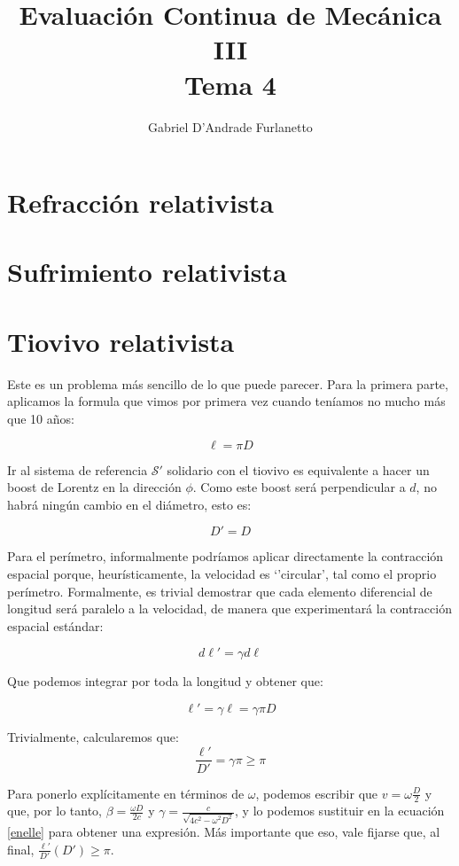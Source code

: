 \documentclass[a4paper,12pt]{article}
\begin{document}
\title{Evaluación Continua de Mecánica III\\ Tema 4}
\author{Gabriel D'Andrade Furlanetto}
\maketitle 

\section{Refracción relativista}

\section{Sufrimiento relativista}

\section{Tiovivo relativista}

Este es un problema más sencillo de lo que puede parecer. Para la primera parte, aplicamos la formula que vimos por primera vez cuando teníamos no mucho más que 10 años:

$$\ell = \pi D $$

Ir al sistema de referencia $\mathcal{S}'$ solidario con el tiovivo es equivalente a hacer un boost de Lorentz en la dirección $\phi$. Como este boost será perpendicular a $d$, no habrá ningún cambio en el diámetro, esto es:

$$D' = D$$ 

Para el perímetro, informalmente podríamos aplicar directamente la contracción espacial porque, heurísticamente, la velocidad es `'circular', tal como el proprio perímetro. Formalmente, es trivial demostrar que cada elemento diferencial de longitud será paralelo a la velocidad, de manera que experimentará la contracción espacial estándar:

$$d\ell' = \gamma d\ell $$

Que podemos integrar por toda la longitud y obtener que:

$$\ell ' = \gamma \ell = \gamma \pi D$$

Trivialmente, calcularemos que:
\begin{equation}
  \label{enelle}
  \frac{\ell'}{D'} = \gamma \pi \geq \pi
\end{equation}
  

Para ponerlo explícitamente en términos de $\omega$, podemos escribir que $v = \omega \frac{D}{2}$ y que, por lo tanto, $\beta = \frac{ \omega D}{2 c}$ y $\gamma = \frac{c}{\sqrt{4c^2 - \omega^2 D^2}}$, y lo podemos sustituir en la ecuación \eqref{enelle} para obtener una expresión. Más importante que eso, vale fijarse que, al final, $\frac{\ell'}{D'}(D') \geq \pi$. 
\end{document}
